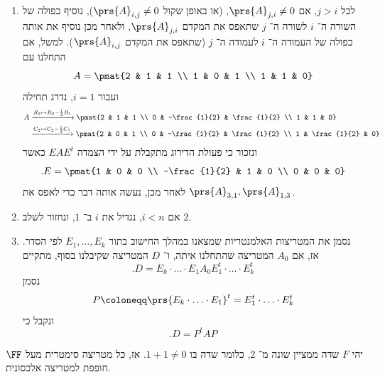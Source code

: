 \documentclass[a4paper,10pt,twoside,openany]{book}
\begin{document}
\begin{algorithm}
\begin{enumerate}
\item
לכל
$j > i$,
אם
$\prs{A}_{j,i} \neq 0$,
(או באופן שקול
$\prs{A}_{i,j} \neq 0$),
נוסיף כפולה של השורה ה־%
$i$
לשורה ה־%
$j$
שתאפס את המקדם
$\prs{A}_{j,i}$,
ולאחר מכן נוסיף את אותה כפולה של העמודה ה־%
$i$
לעמודה ה־%
$j$
(שתאפס את המקדם
$\prs{A}_{i,j}$).
למשל, אם התחלנו עם
\[A = \pmat{2 & 1 & 1 \\ 1 & 0 & 1 \\ 1 & 1 & 0}\]
ועבור
$i=1$,
נדרג תחילה
\begin{align*}
A &\xrightarrow{R_2 \mapsto R_2 - \frac{1}{2} R_1} \pmat{2 & 1 & 1 \\ 0 & -\frac{1}{2} & \frac{1}{2} \\ 1 & 1 & 0}
\\&\xrightarrow{C_2 \mapsto C_2 - \frac{1}{2} C_1} \pmat{2 & 0 & 1 \\ 0 & -\frac{1}{2} & \frac{1}{2} \\ 1 & \frac{1}{2} & 0} 
\end{align*}
ונזכור כי פעולת הדירוג מתקבלת על ידי הצמדה
$E A E^t$
כאשר
\[\text{.} E = \pmat{1 & 0 & 0 \\ -\frac{1}{2} & 1 & 0 \\ 0 & 0 & 0}\]
לאחר מכן, נעשה אותה דבר כדי לאפס את
$\prs{A}_{3,1}, \prs{A}_{1,3}$.

\item
אם
$i < n$,
נגדיל את
$i$
ב־%
$1$,
ונחזור לשלב
$2$.

\item
נסמן את המטריצות האלמנטריות שמצאנו במהלך החישוב בתור
$E_1, \ldots, E_k$
לפי הסדר. אז, אם
$A_0$
המטריצה שהתחלנו איתה, ו־%
$D$
המטריצה שקיבלנו בסוף, מתקיים
\[\text{.} D = E_k \cdot \ldots \cdot E_1 A_0 E_1^t \cdot \ldots \cdot E_k^t\]
נסמן
\begin{align*}
P \coloneqq \prs{E_k \cdot \ldots \cdot E_1}^t = E_1^t \cdot \ldots \cdot E_k^t
\end{align*}
ונקבל כי
\[\text{.} D = P^t A P\]
\end{enumerate}
\end{algorithm}

\begin{corollary}
יהי
$F$
שדה ממציין שונה מ־%
$2$,
כלומר שדה בו
$1 + 1 \neq 0$.
אז, כל מטריצה סימטרית מעל
$\FF$
חופפת למטריצה אלכסונית.
\end{corollary}
\end{document}
